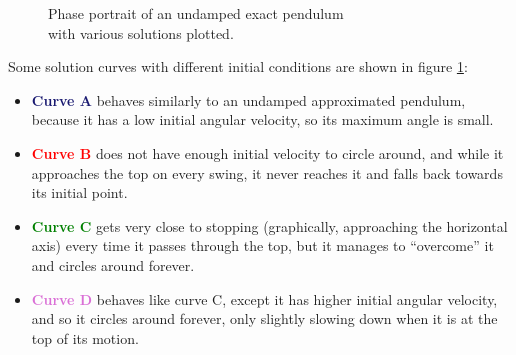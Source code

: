 \documentclass[12pt, a4paper, titlepage]{article}
\theoremstyle{definition}
\numberwithin{equation}{section}
\theoremstyle{definition}
\theoremstyle{definition}
\begin{document}
\begin{figure}[H]
    \centering
    
    \caption{Phase portrait of an undamped exact pendulum\\with various solutions plotted.}
    \label{fig:phase_exact_simple_plot}
\end{figure}
Some solution curves with different initial conditions are shown in figure \ref{fig:phase_exact_simple_plot}:\begin{itemize}
\item \textcolor{MidnightBlue}{\textbf{Curve A}} behaves similarly to an undamped approximated pendulum, because it has a low initial angular velocity, so its maximum angle is small.
\item \textcolor{Red}{\textbf{Curve B}} does not have enough initial velocity to circle around, and while it approaches the top on every swing, it never reaches it and falls back towards its initial point.
\item \textcolor{Green}{\textbf{Curve C}} gets very close to stopping (graphically, approaching the horizontal axis) every time it passes through the top, but it manages to \enquote{overcome} it and circles around forever.
\item \textcolor{Orchid}{\textbf{Curve D}} behaves like curve C, except it has higher initial angular velocity, and so it circles around forever, only slightly slowing down when it is at the top of its motion.
\end{itemize}
\end{document}
